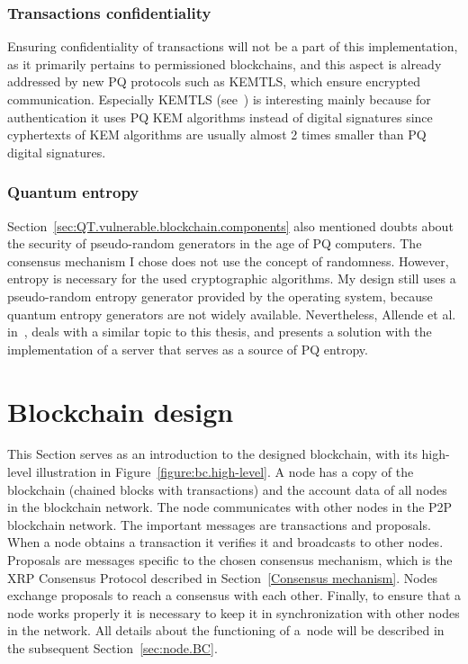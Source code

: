\subsubsection{Transactions confidentiality}

Ensuring confidentiality of transactions will not be a part of this implementation, as it primarily pertains to permissioned blockchains, and this aspect is already addressed by new PQ protocols such as KEMTLS, which ensure encrypted communication. Especially KEMTLS (see~\cite{KEMTLS.web}) is interesting mainly because for authentication it uses PQ KEM algorithms instead of digital signatures since cyphertexts of KEM algorithms are usually almost 2 times smaller than PQ digital signatures.

\subsubsection{Quantum entropy}

Section~\ref{sec:QT.vulnerable.blockchain.components} also mentioned doubts about the security of pseudo-random generators in the age of PQ computers. The consensus mechanism I chose does not use the concept of randomness. However, entropy is necessary for the used cryptographic algorithms. My design still uses a pseudo-random entropy generator provided by the operating system, because quantum entropy generators are not widely available. Nevertheless, Allende et al. in~\cite{QR.blockchain.networks}, deals with a similar topic to this thesis, and presents a solution with the implementation of a server that serves as a source of PQ entropy. 


\section{Blockchain design}
\label{sec:design.BC}

This Section serves as an introduction to the designed blockchain, with its high-level illustration in Figure~\ref{figure:bc.high-level}. A node has a copy of the blockchain (chained blocks with transactions) and the account data of all nodes in the blockchain network. The node communicates with other nodes in the P2P blockchain network. The important messages are transactions and proposals. When a node obtains a transaction it verifies it and broadcasts to other nodes. Proposals are messages specific to the chosen consensus mechanism, which is the XRP Consensus Protocol described in Section~\ref{Consensus mechanism}. Nodes exchange proposals to reach a consensus with each other. Finally, to ensure that a node works properly it is necessary to keep it in synchronization with other nodes in the network. All details about the functioning of a~node will be described in the subsequent Section~\ref{sec:node.BC}.

